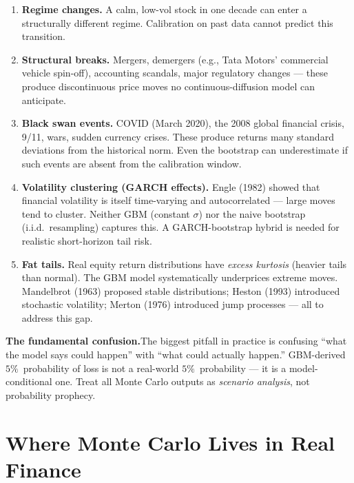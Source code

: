 \documentclass[11pt, a4paper]{article}
\begin{document}
\begin{enumerate}[leftmargin=2em, label=\textbf{\arabic*.}]
  \item \textbf{Regime changes.} A calm, low-vol stock in one decade can enter a structurally different regime. Calibration on past data cannot predict this transition.

  \item \textbf{Structural breaks.} Mergers, demergers (e.g., Tata Motors' commercial vehicle spin-off), accounting scandals, major regulatory changes — these produce discontinuous price moves no continuous-diffusion model can anticipate.

  \item \textbf{Black swan events.} COVID (March 2020), the 2008 global financial crisis, 9/11, wars, sudden currency crises. These produce returns many standard deviations from the historical norm. Even the bootstrap can underestimate if such events are absent from the calibration window.

  \item \textbf{Volatility clustering (GARCH effects).} Engle (1982) showed that financial volatility is itself time-varying and autocorrelated — large moves tend to cluster. Neither GBM (constant $\sigma$) nor the naive bootstrap (i.i.d.\ resampling) captures this. A GARCH-bootstrap hybrid is needed for realistic short-horizon tail risk.

  \item \textbf{Fat tails.} Real equity return distributions have \emph{excess kurtosis} (heavier tails than normal). The GBM model systematically underprices extreme moves. Mandelbrot (1963) proposed stable distributions; Heston (1993) introduced stochastic volatility; Merton (1976) introduced jump processes — all to address this gap.
\end{enumerate}

\begin{tcolorbox}[warnbox]
\textbf{The fundamental confusion.}\quad The biggest pitfall in practice is confusing ``what the model says could happen'' with ``what could actually happen.'' GBM-derived $5\%$~probability of loss is not a real-world $5\%$~probability — it is a model-conditional one. Treat all Monte Carlo outputs as \emph{scenario analysis}, not probability prophecy.
\end{tcolorbox}

\section{Where Monte Carlo Lives in Real Finance}
\label{sec:applications}
\end{document}
